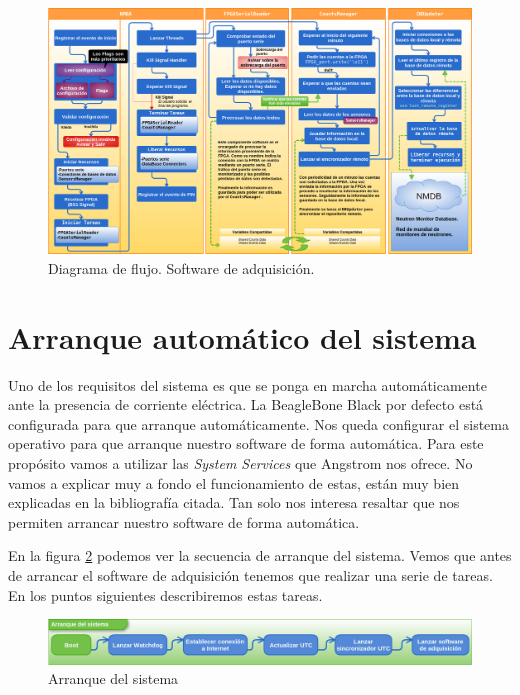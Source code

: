 \begin{figure}
	\centering
	\includegraphics[keepaspectratio, width=1\textwidth]{./img/soft_adquisicion.png}
	\caption{Diagrama de flujo. Software de adquisición.}
	\label{fig:soft_adquisición}
\end{figure}

\section{Arranque automático del sistema}
	Uno de los requisitos del sistema es que se ponga en marcha automáticamente ante la presencia de corriente eléctrica. La BeagleBone Black por
	defecto está configurada para que arranque automáticamente. Nos queda configurar el sistema operativo para que arranque nuestro software de
	forma automática. Para este propósito vamos a utilizar las \emph{System Services}\cite{AngSystemctl} que Angstrom nos ofrece. No vamos a
	explicar muy a fondo el funcionamiento de estas, están muy bien explicadas en la bibliografía citada. Tan solo nos interesa resaltar que nos
	permiten arrancar nuestro software de forma automática.
	\par
	En la figura \ref{fig:boot} podemos ver la secuencia de arranque del sistema. Vemos que antes de arrancar el software de adquisición tenemos
	que realizar una serie de tareas. En los puntos siguientes describiremos estas tareas.
	\begin{figure}[h]
		\centering
		\includegraphics[keepaspectratio, width=1\textwidth]{./img/boot.png}
		\caption{Arranque del sistema}   
		\label{fig:boot}
	\end{figure}
